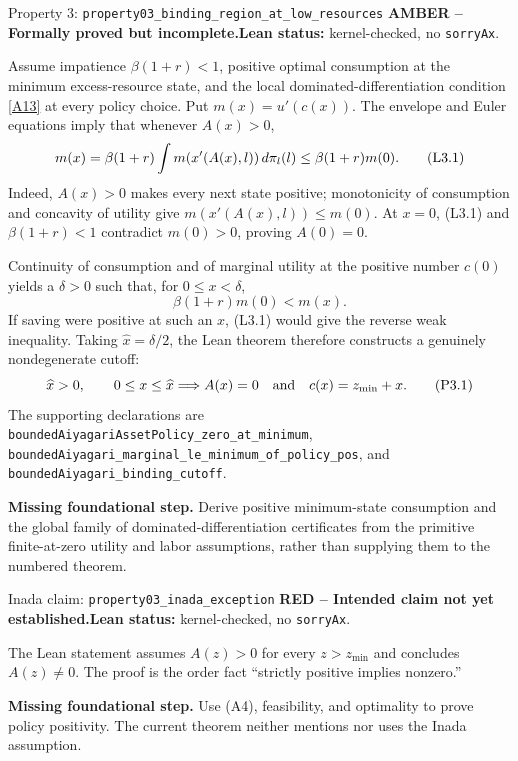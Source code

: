 \documentclass[11pt]{article}
\newcommand{\leanname}[1]{\nolinkurl{#1}}
\newcommand{\eqP}[1]{\refstepcounter{equation}\tag{P#1}}
\newcommand{\eqL}[1]{\refstepcounter{equation}\tag{L#1}}
\newcommand{\formalcheck}{\textbf{Lean status:} kernel-checked, no \texttt{sorryAx}.}
\newcommand{\missing}[1]{\par\smallskip\textbf{Missing foundational step.} #1}
\newcommand{\amberstatus}{\textcolor{conditional}{\textbf{AMBER -- Formally proved but incomplete.}}}
\newcommand{\redstatus}{\textcolor{incomplete}{\textbf{RED -- Intended claim not yet established.}}}
\begin{document}
\begin{amberbox}{Property 3: \leanname{property03_binding_region_at_low_resources}}
\amberstatus\quad\formalcheck

Assume impatience \(\beta(1+r)<1\), positive optimal consumption at the
minimum excess-resource state, and the local dominated-differentiation
condition \eqref{A13} at every policy choice.  Put
\(m(x)=u'(c(x))\).  The envelope and Euler equations imply that whenever
\(A(x)>0\),
\begin{equation}
 m(x)=\beta(1+r)\int m(x'(A(x),l))\,d\pi_l(l)
 \leq \beta(1+r)m(0). \eqL{3.1}\label{L3.1}
\end{equation}
Indeed, \(A(x)>0\) makes every next state positive; monotonicity of
consumption and concavity of utility give
\(m(x'(A(x),l))\leq m(0)\).  At \(x=0\), (L3.1) and
\(\beta(1+r)<1\) contradict \(m(0)>0\), proving \(A(0)=0\).

Continuity of consumption and of marginal utility at the positive number
\(c(0)\) yields a \(\delta>0\) such that, for \(0\leq x<\delta\),
\[
 \beta(1+r)m(0)<m(x).
\]
If saving were positive at such an \(x\), (L3.1) would give the reverse weak
inequality.  Taking \(\widehat x=\delta/2\), the Lean theorem therefore
constructs a genuinely nondegenerate cutoff:
\begin{equation}
 \widehat x>0,\qquad
 0\leq x\leq\widehat x\Longrightarrow
 A(x)=0\quad\hbox{and}\quad c(x)=z_{\min}+x.
 \eqP{3.1}\label{P3.1}
\end{equation}
The supporting declarations are
\leanname{boundedAiyagariAssetPolicy_zero_at_minimum},
\leanname{boundedAiyagari_marginal_le_minimum_of_policy_pos}, and
\leanname{boundedAiyagari_binding_cutoff}.

\missing{Derive positive minimum-state consumption and the global family of
dominated-differentiation certificates from the primitive finite-at-zero
utility and labor assumptions, rather than supplying them to the numbered
theorem.}
\end{amberbox}

\begin{redbox}{Inada claim: \leanname{property03_inada_exception}}
\redstatus\quad\formalcheck

The Lean statement assumes \(A(z)>0\) for every \(z>z_{\min}\) and concludes
\(A(z)\ne0\).  The proof is the order fact ``strictly positive implies
nonzero.''

\missing{Use (A4), feasibility, and optimality to prove policy positivity.
The current theorem neither mentions nor uses the Inada assumption.}
\end{redbox}
\end{document}
